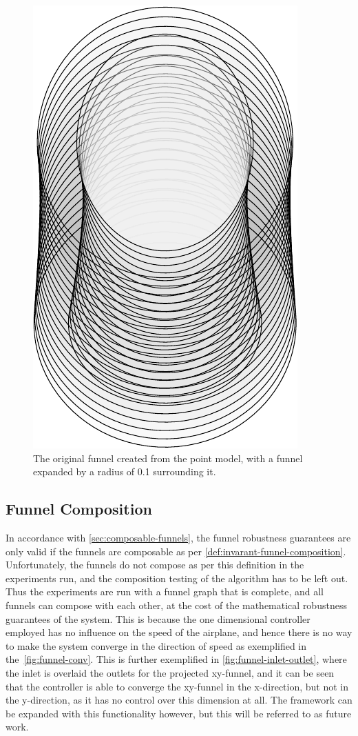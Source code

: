 \begin{figure}[!t]
  \centering \includegraphics[scale=.5]{figures/method/expanded-funnel}
  \caption[The expanded experiment funnel]{The original funnel created from the point model, with a funnel
    expanded by a radius of 0.1 surrounding it.}
  \label{fig:expanded-funnel}
\end{figure}

\subsection{Funnel Composition}
\label{subsec:funnel-no-composable}

In accordance with \cref{sec:composable-funnels}, the funnel robustness
guarantees are only valid if the funnels are composable as per
\cref{def:invarant-funnel-composition}. Unfortunately, the funnels do not
compose as per this definition in the experiments run, and the composition
testing of the algorithm has to be left out. Thus the experiments are run with a
funnel graph that is complete, and all funnels can compose with each other, at
the cost of the mathematical robustness guarantees of the system. This is
because the one dimensional controller employed has no influence on the speed of
the airplane, and hence there is no way to make the system converge in the
direction of speed as exemplified in the~\cref{fig:funnel-conv}. This is further
exemplified in \cref{fig:funnel-inlet-outlet}, where the inlet is overlaid the
outlets for the projected xy-funnel, and it can be seen that the controller is
able to converge the xy-funnel in the x-direction, but not in the y-direction,
as it has no control over this dimension at all. The framework can be expanded
with this functionality however, but this will be referred to as future work.

